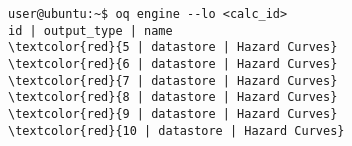 \begin{Verbatim}[frame=single, commandchars=\\\{\}, fontsize=\small]
user@ubuntu:~$ oq engine --lo <calc_id>
id | output_type | name
\textcolor{red}{5 | datastore | Hazard Curves}
\textcolor{red}{6 | datastore | Hazard Curves}
\textcolor{red}{7 | datastore | Hazard Curves}
\textcolor{red}{8 | datastore | Hazard Curves}
\textcolor{red}{9 | datastore | Hazard Curves}
\textcolor{red}{10 | datastore | Hazard Curves}
\end{Verbatim}